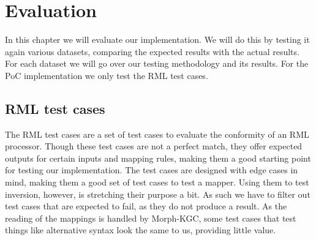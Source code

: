 \chapter{Evaluation}
\label{chapter:evaluation}
In this chapter we will evaluate our implementation. We will do this by testing it again various datasets, comparing the expected results with the actual results. For each dataset we will go over our testing methodology and its results. For the PoC implementation we only test the RML test cases.

\section{RML test cases}
\label{section:rml_test_cases}
The RML test cases are a set of test cases to evaluate the conformity of an RML processor. Though these test cases are not a perfect match, they offer expected outputs for certain inputs and mapping rules, making them a good starting point for testing our implementation. The test cases are designed with edge cases in mind, making them a good set of test cases to test a mapper. Using them to test inversion, however, is stretching their purpose a bit. As such we have to filter out test cases that are expected to fail, as they do not produce a result. As the reading of the mappings is handled by Morph-KGC, some test cases that test things like alternative syntax look the same to us, providing little value.

